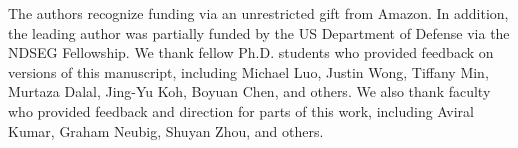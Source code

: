 The authors recognize funding via an unrestricted gift from Amazon. In addition, the leading author was partially funded by the US Department of Defense via the NDSEG Fellowship. 
We thank fellow Ph.D. students who provided feedback on versions of this manuscript, including Michael Luo, Justin Wong, Tiffany Min, Murtaza Dalal, Jing-Yu Koh, Boyuan Chen, and others. We also thank faculty who provided feedback and direction for parts of this work, including Aviral Kumar, Graham Neubig, Shuyan Zhou, and others. 